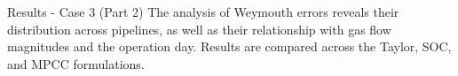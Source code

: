\documentclass[hyperref={colorlinks,citecolor=blue,linkcolor=blue,urlcolor=blue}]{beamer}
\newlength\figureheight
\newlength\figurewidth
\begin{document}
\begin{frame}{Results - Case 3 (Part 2)}
\footnotesize
    \justifying
    The analysis of Weymouth errors reveals their distribution across pipelines, 
    as well as their relationship with gas flow magnitudes and the operation day. 
    Results are compared across the Taylor, SOC, and MPCC formulations.
    
    \vspace{0.9em}
    \begin{figure}[!htb]
        \setlength{}        
        \setlength{} 
    \end{figure}
\end{frame}








%     
%
%
%
%
%
\end{document}
